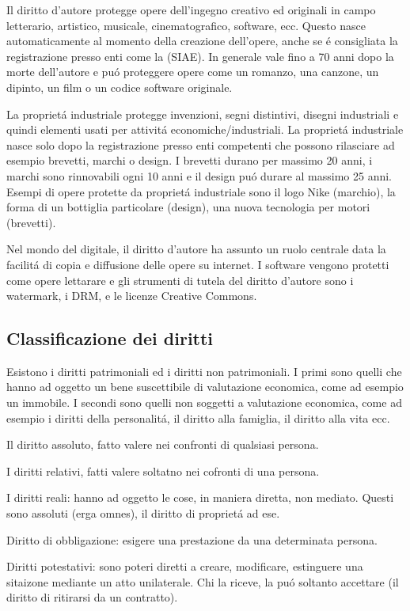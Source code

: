 \documentclass{article}
\begin{document}
Il diritto d'autore protegge opere dell'ingegno creativo ed originali in campo letterario, artistico, musicale, cinematografico, software, ecc. Questo nasce automaticamente al momento della creazione dell'opere, anche se \'e consigliata la registrazione presso enti come la (SIAE). In generale vale fino a 70 anni dopo la morte dell'autore e pu\'o proteggere opere come un romanzo, una canzone, un dipinto, un film o un codice software originale.

La propriet\'a industriale protegge invenzioni, segni distintivi, disegni industriali e quindi elementi usati per attivit\'a economiche/industriali. La propriet\'a industriale nasce solo dopo la registrazione presso enti competenti che possono rilasciare ad esempio brevetti, marchi o design. I brevetti durano per massimo 20 anni, i marchi sono rinnovabili ogni 10 anni e il design pu\'o durare al massimo 25 anni. Esempi di opere protette da propriet\'a industriale sono il logo Nike (marchio), la forma di un bottiglia particolare (design), una nuova tecnologia per motori (brevetti).

Nel mondo del digitale, il diritto d'autore ha assunto un ruolo centrale data la facilit\'a di copia e diffusione delle opere su internet. I software vengono protetti come opere lettarare e gli strumenti di tutela del diritto d'autore sono i watermark, i DRM, e le licenze Creative Commons.

\subsection{Classificazione dei diritti}
Esistono i diritti patrimoniali ed i diritti non patrimoniali. I primi sono quelli che hanno ad oggetto un bene suscettibile di valutazione economica, come ad esempio un immobile. I secondi sono quelli non soggetti a valutazione economica, come ad esempio i diritti della personalit\'a, il diritto alla famiglia, il diritto alla vita ecc.

Il diritto assoluto, fatto valere nei confronti di qualsiasi persona. 

I diritti relativi, fatti valere soltatno nei cofronti di una persona. 

I diritti reali: hanno ad oggetto le cose, in maniera diretta, non mediato. Questi sono assoluti (erga omnes), il diritto di propriet\'a ad ese.

Diritto di obbligazione: esigere una prestazione da una determinata persona.

Diritti potestativi: sono poteri diretti a creare, modificare, estinguere una sitaizone mediante un atto unilaterale. Chi la riceve, la pu\'o soltanto accettare (il diritto di ritirarsi da un contratto).
\end{document}
